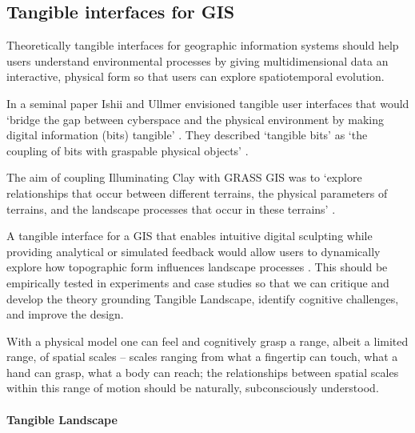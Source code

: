\documentclass{isprs}
\begin{document}
\subsection{Tangible interfaces for GIS}

Theoretically tangible interfaces for geographic information systems should help users understand environmental processes
by giving multidimensional data an interactive, physical form 
so that users can explore spatiotemporal evolution.


In a seminal paper Ishii and Ullmer envisioned tangible user interfaces that would 
`bridge the gap between cyberspace and the physical environment by making digital information (bits) tangible' \cite{Ishii1997}.
They described `tangible bits' as `the coupling of bits with graspable physical objects' \cite{Ishii1997}. 

The aim of coupling Illuminating Clay with GRASS GIS was to 
`explore relationships that occur between different terrains, the physical parameters of terrains, and the landscape processes that occur in these terrains' \cite{Mitasova2006}. 

A tangible interface for a GIS that enables intuitive digital sculpting while providing analytical or simulated feedback would allow users to dynamically explore how topographic form influences landscape processes \cite{Mitasova2006}. 
%
This should be empirically tested in experiments and case studies 
so that we can critique and develop the theory grounding Tangible Landscape, 
identify cognitive challenges, and 
improve the design.  

With a physical model one can feel and cognitively grasp a range, albeit a limited range, of spatial scales 
-- scales ranging from what a fingertip can touch, what a hand can grasp, what a body can reach; 
the relationships between spatial scales within this range of motion 
should be naturally, subconsciously understood. 
%

\paragraph{Tangible Landscape}



\cite{Petrasova2015}
\end{document}
